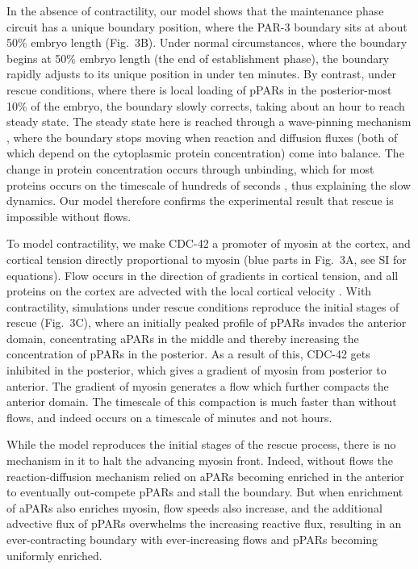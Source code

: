 \documentclass[11pt]{article}
\newcommand{\6}[1]{#1_{\text{6}}}
\newcommand{\3}[1]{#1_{\text{3}}}
\begin{document}
In the absence of contractility, our model shows that the maintenance phase circuit has a unique boundary position, where the PAR-3 boundary sits at about 50\% embryo length (Fig.\ 3B). Under normal circumstances, where the boundary begins at 50\% embryo length (the end of establishment phase), the boundary rapidly adjusts to its unique position in under ten minutes. By contrast, under rescue conditions, where there is local loading of pPARs in the posterior-most 10\% of the embryo, the boundary slowly corrects, taking about an hour to reach steady state. The steady state here is reached through a wave-pinning mechanism \citep{mori2008wave, goehring2011polarization}, where the boundary stops moving when reaction and diffusion fluxes (both of which depend on the cytoplasmic protein concentration) come into balance. The change in protein concentration occurs through unbinding, which for most proteins occurs on the timescale of hundreds of seconds \citep{robin2014single}, thus explaining the slow dynamics. Our model therefore confirms the experimental result that rescue is impossible without flows.

To model contractility, we make CDC-42 a promoter of myosin at the cortex, and cortical tension directly proportional to myosin (blue parts in Fig.\ 3A, see SI for equations). Flow occurs in the direction of gradients in cortical tension, and all proteins on the cortex are advected with the local cortical velocity \citep{illukkumbura2023design}. With contractility, simulations under rescue conditions reproduce the initial stages of rescue (Fig.\ 3C), where an initially peaked profile of pPARs invades the anterior domain, concentrating aPARs in the middle and thereby increasing the concentration of pPARs in the posterior. As a result of this, CDC-42 gets inhibited in the posterior, which gives a gradient of myosin from posterior to anterior. The gradient of myosin generates a flow which further compacts the anterior domain. The timescale of this compaction is much faster than without flows, and indeed occurs on a timescale of minutes and not hours.

While the model reproduces the initial stages of the rescue process, there is no mechanism in it to halt the advancing myosin front. Indeed, without flows the reaction-diffusion mechanism relied on aPARs becoming enriched in the anterior to eventually out-compete pPARs and stall the boundary. But when enrichment of aPARs also enriches myosin, flow speeds also increase, and the additional advective flux of pPARs overwhelms the increasing reactive flux, resulting in an ever-contracting boundary with ever-increasing flows and pPARs becoming uniformly enriched.
\end{document}
